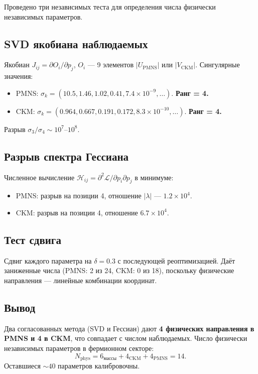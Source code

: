 \documentclass[11pt,a4paper]{article}
\numberwithin{equation}{section}
\begin{document}
Проведено три независимых теста для определения
числа физически независимых параметров.

\subsection{SVD якобиана наблюдаемых}

Якобиан $J_{ij} = \partial O_i/\partial p_j$,
$O_i$ --- 9 элементов $|U_{\text{PMNS}}|$ или
$|V_{\text{CKM}}|$. Сингулярные значения:
\begin{itemize}[leftmargin=1.5em,itemsep=0.05em]
\item PMNS: $\sigma_k = (10.5, 1.46, 1.02, 0.41,
      7.4\times 10^{-9},\ldots)$. \textbf{Ранг = 4.}
\item CKM: $\sigma_k = (0.964, 0.667, 0.191, 0.172,
      8.3\times 10^{-10},\ldots)$. \textbf{Ранг = 4.}
\end{itemize}
Разрыв $\sigma_3/\sigma_4 \sim 10^7$--$10^8$.

\subsection{Разрыв спектра Гессиана}

Численное вычисление $\mathcal{H}_{ij} = \partial^2 \mathcal{L}/\partial p_i \partial p_j$
в минимуме:
\begin{itemize}[leftmargin=1.5em,itemsep=0.05em]
\item PMNS: разрыв на позиции 4, отношение $|\lambda|$ --- $1.2\times 10^4$.
\item CKM: разрыв на позиции 4, отношение $6.7\times 10^4$.
\end{itemize}

\subsection{Тест сдвига}

Сдвиг каждого параметра на $\delta = 0.3$ с
последующей реоптимизацией. Даёт заниженные
числа (PMNS: 2 из 24, CKM: 0 из 18), поскольку
физические направления --- линейные комбинации
координат.

\subsection{Вывод}

Два согласованных метода (SVD и Гессиан) дают
\textbf{4 физических направления в PMNS и 4 в CKM},
что совпадает с числом наблюдаемых. Число
физически независимых параметров в фермионном
секторе:
\begin{equation}
N_{\text{phys}} = 6_{\text{массы}} + 4_{\text{CKM}} + 4_{\text{PMNS}} = 14.
\end{equation}
Оставшиеся $\sim 40$ параметров калибровочны.
\end{document}
